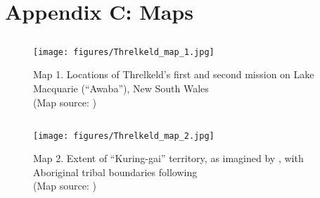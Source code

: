 \chapter*{Appendix C: Maps}
\label{Appendix_C}

\section*{}

\begin{figure}
    \center
    \caption*{Map 1. Locations of Threlkeld's first and second mission on Lake Macquarie (“Awaba”), New South Wales\\
    (Map source: \cite[452]{carey_lancelot_2010})}
    \texttt{[image: figures/Threlkeld\_map\_1.jpg]}
\end{figure}

\newpage

\section*{}
\label{sec:Map_2}

\begin{figure}
    \center
    \caption*{Map 2. Extent of “Kuring-gai” territory, as imagined by \citet{fraser_gospel_1891}, with Aboriginal tribal boundaries following \citet{tindale_aboriginal_1974}\\
    (Map source: \cite[457]{carey_lancelot_2010})}
    \texttt{[image: figures/Threlkeld\_map\_2.jpg]}
\end{figure}